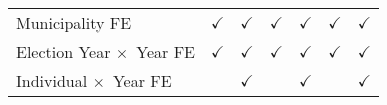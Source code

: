 {\begin{tabular}{lcccccc}
Municipality FE 	
            & $\checkmark$  							   
            & $\checkmark$  		
            & $\checkmark$ 						
            & $\checkmark$ 
            & $\checkmark$ 			  
            & $\checkmark$   \\
Election Year $\times$\ Year FE 	
            & $\checkmark$  							   
            & $\checkmark$  		
            & $\checkmark$ 						
            & $\checkmark$ 
            & $\checkmark$ 			  
            & $\checkmark$   \\
Individual $\times$\ Year FE 	
            & 					   
            & $\checkmark$  		
            &						
            & $\checkmark$ 
            & 			  
            & $\checkmark$   \\

\bottomrule							

\end{tabular}
}


